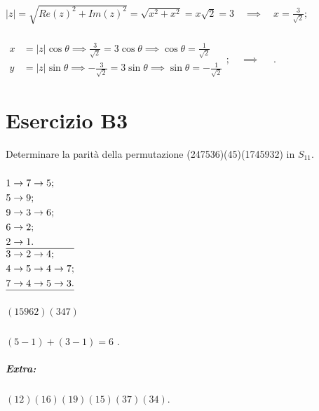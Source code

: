 \documentclass[a4paper]{report}
\newenvironment{problem}
        {
                \begin{mdframed}[topline=false,rightline=false,bottomline=false]
                        \slshape
        }
        {
                \end{mdframed}
        }
\begin{document}
        \paragraph{}
        $
                |z| = \sqrt{{Re(z)}^2 + {Im(z)}^2} = \sqrt{x^2 + x^2} = x \sqrt{2} = 3 \quad \implies \quad
                x = \frac{3}{\sqrt{2}};
        $

        \paragraph{}
        $
                \begin{aligned}
                        x & = |z| \cos{\theta} \implies
                                \frac{3}{\sqrt{2}} = 3 \cos{\theta} \implies
                                \cos{\theta} = \frac{1}{\sqrt{2}} \\
                        y & = |z| \sin{\theta} \implies
                                -\frac{3}{\sqrt{2}} = 3 \sin{\theta} \implies
                                \sin{\theta} = -\frac{1}{\sqrt{2}}
                \end{aligned};
                \quad \implies \quad
        $
        .


        \chapter*{Esercizio B3}
        \begin{problem}
                Determinare la parit\`{a} della permutazione (247536)(45)(1745932) in $S_{11}$.
        \end{problem}

        \paragraph{}
        $
                \begin{aligned}
                        1 & \to 7 \to 5; \\
                        5 & \to 9; \\
                        9 & \to 3 \to 6; \\
                        6 & \to 2; \\
                        2 & \to 1. \\
                        \hline
                        3 & \to 2 \to 4; \\
                        4 & \to 5 \to 4 \to 7; \\
                        7 & \to 4 \to 5 \to 3. \\
                        \hline
                \end{aligned}
        $

        \paragraph{}
        $ (15962)(347) $

        \paragraph{}
        $ (5 - 1) + (3 - 1) = 6 $ .

        \paragraph{Extra:}
        $ (12)(16)(19)(15)(37)(34) $.
\end{document}
